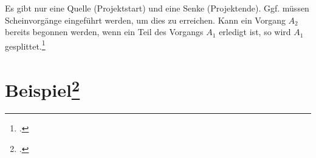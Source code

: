 \documentclass{lehramt-informatik-haupt}
\begin{document}
\begin{center}
\end{center}

\noindent
Es gibt nur eine Quelle (Projektstart) und eine Senke (Projektende).
Ggf. müssen Scheinvorgänge eingeführt werden, um dies zu erreichen.
%
Kann ein Vorgang $A_2$ bereits begonnen werden, wenn ein Teil des
Vorgangs $A_1$ erledigt ist, so wird $A_1$ gesplittet.\footcite[Seite
27]{sosy:fs:3}

\section{Beispiel\footcite[Seite 16 - 21]{sosy:fs:3}}

\begin{center}
\end{center}
\end{document}
